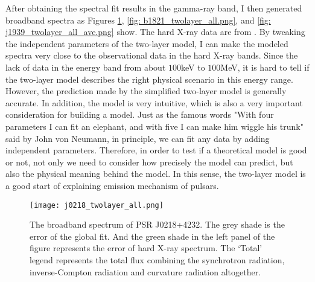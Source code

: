 \documentclass[a4paper, 12pt]{report}
\newcommand{\change}[1]{
  $<$\colorbox{red}{\textbf{change}}$>$#1$<$\colorbox{red}{\textbf{/change}}$>$
}
\begin{document}
    \begin{table}[!htp]
      \centering
      \caption[The results of fit parameters for the three MSPs.]
        {The results of fit parameters for the three MSPs. The physical 
        meaning of each parameter is consistent with the two-layer model described above.}
      \label{table: twolayer_fit_parameter}
    \end{table}
    \vspace{0.5cm}
          
    After obtaining the spectral fit results in the gamma-ray band, I then generated 
    broadband spectra as Figures \ref{fig: j0218_twolayer_all.png}, 
    \ref{fig: b1821_twolayer_all.png}, and \ref{fig: j1939_twolayer_all_ave.png} show. 
    The hard X-ray data are from \citet{0004-637X-845-2-159}. By tweaking the independent 
    parameters of the two-layer model, I can make the modeled spectra 
    very close to the observational data in the hard X-ray bands. Since the lack of data in 
    the energy band from about $100$keV to $100$MeV, it is hard to tell if the two-layer model 
    describes the right physical scenario in this energy range. However, the prediction made 
    by the simplified two-layer model is generally accurate. In addition, the model is very 
    intuitive, which is also a very important consideration for building a model. Just as 
    the famous words "With four parameters I can fit an elephant, and with five I 
    can make him wiggle his trunk" 
    said by John von Neumann, in principle, we can fit any data by adding independent 
    parameters. Therefore, in order to test if a theoretical model is good or not, not only we 
    need to consider how precisely the model can predict, but also the physical meaning 
    behind the model. In this sense, the two-layer model is a good start of explaining 
    emission mechanism of pulsars. 
    
    \begin{figure}[!htp]
      \centering 
      \texttt{[image: j0218\_twolayer\_all.png]}
      \caption[The broadband spectrum of PSR J0218+4232.]
        {The broadband spectrum of PSR J0218+4232.
        The grey shade is the error of the global fit. And the green shade in the left panel of 
        the figure represents the error of hard X-ray spectrum. The `Total' legend represents the 
        total flux combining the synchrotron radiation, inverse-Compton radiation and curvature 
        radiation altogether.}
      \label{fig: j0218_twolayer_all.png}
    \end{figure}
\end{document}
